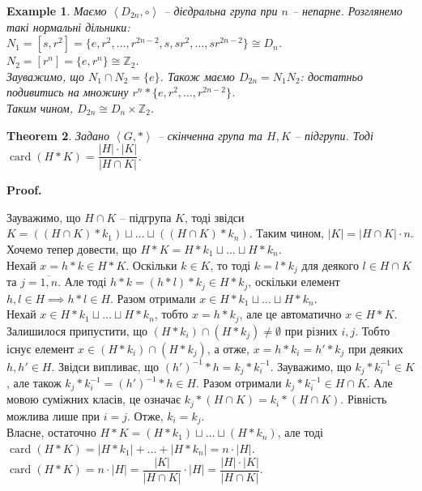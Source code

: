 \documentclass[a4paper, 10pt]{article}
\makeatletter
\theoremstyle{theoremdd}
\newtheorem{theorem}{Theorem}[subsection]
\theoremstyle{theoremdd}
\theoremstyle{theoremdd}
\theoremstyle{theoremdd}
\theoremstyle{theoremdd}
\newtheorem{example}[theorem]{Example}
\theoremstyle{theoremdd}
\theoremstyle{theoremdd}
\theoremstyle{theoremdd}
\theoremstyle{theoremdd}
\theoremstyle{theoremdd}
\theoremstyle{theoremdd}
\theoremstyle{theoremdd}
\theoremstyle{theoremdd}
\theoremstyle{theoremdd}
\theoremstyle{theoremdd}
\renewenvironment{proof}[1][Proof.\\]{\par
\pushQED{\hfill \qed}%
\normalfont \topsep6\p@\@plus6\p@\relax
\trivlist
\item\relax
{\bfseries
#1\@addpunct{.}}\hspace\labelsep\ignorespaces
}{%
\popQED\endtrivlist\@endpefalse
}
\DeclareMathOperator{\card}{card}
\makeatother
\begin{document}
\begin{example}
Маємо $\left<D_{2n}, \circ \right>$ -- дієдральна група при $n$ -- непарне. Розглянемо такі нормальні дільники:\\
$N_1 = [s,r^2] = \{e,r^2,\dots,r^{2n-2},s,sr^2,\dots,sr^{2n-2}\} \cong D_n$.\\
$N_2 = [r^n] = \{e,r^n\} \cong \mathbb{Z}_2$.\\
Зауважимо, що $N_1 \cap N_2 = \{e\}$. Також маємо $D_{2n} = N_1N_2$: достатньо подивитись на множину $r^n * \{e,r^2,\dots,r^{2n-2}\}$.\\
Таким чином, $D_{2n} \cong D_n \times \mathbb{Z}_2$.
\end{example}

\begin{theorem}
Задано $\left<G,*\right>$ -- скінченна група та $H,K$ -- підгрупи. Тоді $\card(H*K) = \dfrac{|H| \cdot |K|}{|H \cap K|}$.
\end{theorem}

\begin{proof}
Зауважимо, що $H \cap K$ -- підгрупа $K$, тоді звідси $K = ((H \cap K)*k_1) \sqcup \dots \sqcup ((H \cap K)*k_n)$. Таким чином, $|K| = |H \cap K| \cdot n$.\\
Хочемо тепер довести, що $H*K = H*k_1 \sqcup \dots \sqcup H*k_n$.\\
Нехай $x = h*k \in H*K$. Оскільки $k \in K$, то тоді $k = l*k_j$ для деякого $l \in H \cap K$ та $j = \overline{1,n}$. Але тоді $h*k = (h*l)*k_j \in H*k_j$, оскільки елемент $h,l \in H \implies h*l \in H$. Разом отримали $x \in H*k_1 \sqcup \dots \sqcup H*k_n$.\\
Нехай $x \in H*k_1 \sqcup \dots \sqcup H*k_n$, тобто $x = h*k_j$, але це автоматично $x \in H*K$.\\
Залишилося припустити, що $(H*k_i) \cap (H*k_j) \neq \emptyset$ при різних $i,j$. Тобто існує елемент $x \in (H*k_i) \cap (H*k_j)$, а отже, $x = h*k_i = h'*k_j$ при деяких $h,h' \in H$. Звідси випливає, що $(h')^{-1}*h = k_j*k_i^{-1}$. Зауважимо, що $k_j * k_i^{-1} \in K$, але також $k_j * k_i^{-1} = (h')^{-1}*h \in H$. Разом отримали $k_j * k_i^{-1} \in H \cap K$. Але мовою суміжних класів, це означає $k_j * (H \cap K) = k_i * (H \cap K)$. Рівність можлива лише при $i = j$. Отже, $k_i = k_j$.\\
Власне, остаточно $H*K = (H*k_1) \sqcup \dots \sqcup (H*k_n)$, але тоді $\card(H*K) = |H*k_1| + \dots + |H*k_n| = n \cdot |H|$.\\
$\card(H*K) = n \cdot |H| = \dfrac{|K|}{|H \cap K|} \cdot |H| = \dfrac{|H| \cdot |K|}{|H \cap K|}$.
\end{proof}
\end{document}
